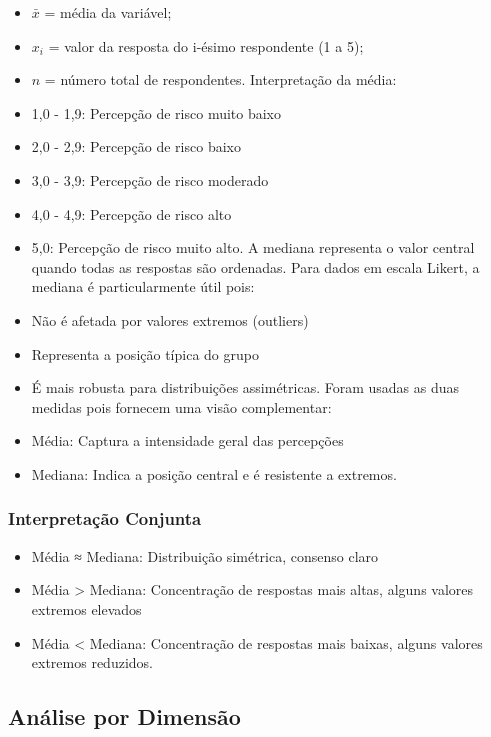 \documentclass[
  portuguese,
  letterpaper,
  DIV=11,
  numbers=noendperiod]{scrreprt}
\providecommand{\tightlist}{%
  \setlength{\itemsep}{0pt}\setlength{\parskip}{0pt}}
\begin{document}
\begin{itemize}
\item
  \(\bar{x}\) = média da variável;
\item
  \(x_i\) = valor da resposta do i-ésimo respondente (1 a 5);
\item
  \(n\) = número total de respondentes. Interpretação da média:
\item
  1,0 - 1,9: Percepção de risco muito baixo
\item
  2,0 - 2,9: Percepção de risco baixo
\item
  3,0 - 3,9: Percepção de risco moderado
\item
  4,0 - 4,9: Percepção de risco alto
\item
  5,0: Percepção de risco muito alto. A mediana representa o valor
  central quando todas as respostas são ordenadas. Para dados em escala
  Likert, a mediana é particularmente útil pois:
\item
  Não é afetada por valores extremos (outliers)
\item
  Representa a posição típica do grupo
\item
  É mais robusta para distribuições assimétricas. Foram usadas as duas
  medidas pois fornecem uma visão complementar:
\item
  Média: Captura a intensidade geral das percepções
\item
  Mediana: Indica a posição central e é resistente a extremos.
\end{itemize}

\subsubsection{Interpretação
Conjunta}\label{interpretauxe7uxe3o-conjunta}

\begin{itemize}
\tightlist
\item
  Média ≈ Mediana: Distribuição simétrica, consenso claro
\item
  Média \textgreater{} Mediana: Concentração de respostas mais altas,
  alguns valores extremos elevados
\item
  Média \textless{} Mediana: Concentração de respostas mais baixas,
  alguns valores extremos reduzidos.
\end{itemize}

\subsection{Análise por Dimensão}\label{anuxe1lise-por-dimensuxe3o}
\end{document}
